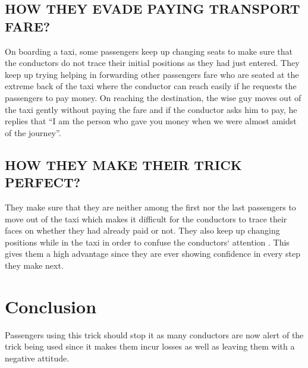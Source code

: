 \documentclass{article}
\begin{document}
\subsection{HOW THEY EVADE PAYING TRANSPORT FARE?}
{On boarding a taxi, some passengers keep up changing seats to make sure that the conductors do not trace their initial positions as they had just entered. They keep up trying helping in forwarding other passengers fare who are seated at the extreme back of the taxi where the conductor can reach easily if he requests the passengers to pay money. On reaching the destination, the wise guy moves out of the taxi gently without  paying the fare and if the conductor asks him to pay, he replies that “I am the person who gave you money when we were almost amidst of the journey”.}

\subsection{HOW THEY MAKE THEIR TRICK PERFECT?}
{They make sure that they are neither among the first nor the last passengers to move out of the taxi which makes it difficult for the conductors to trace their faces on whether they had already paid or not.
They also keep up changing positions while in the taxi in order to confuse the conductors` attention . This gives them a high advantage since they are ever showing  confidence in every step they make next.
}
\section{Conclusion}
{Passengers using this trick should stop it as many conductors are now alert of the trick being used since it makes them incur losses as well as leaving them with a negative attitude. }
\end{document}
